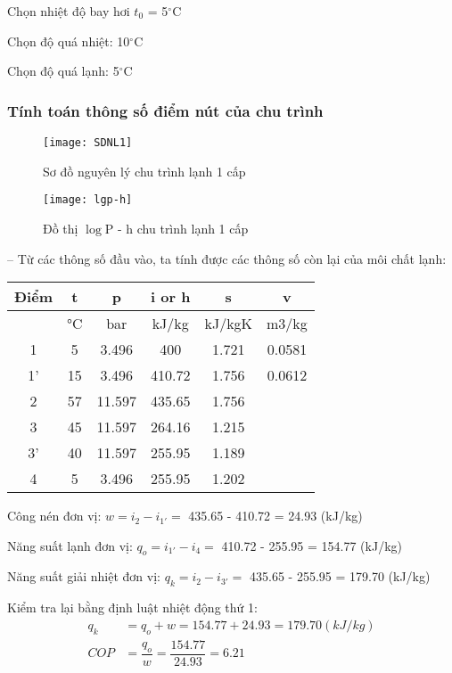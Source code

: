 Chọn nhiệt độ bay hơi $t_{0}$ = 5$^{\circ}$C

Chọn độ quá nhiệt: 10$^{\circ}$C

Chọn độ quá lạnh: 5$^{\circ}$C

\subsubsection{Tính toán thông số điểm nút của chu trình}
\begin{figure}[H]
	\centering
	\texttt{[image: SDNL1]}
	\caption{Sơ đồ nguyên lý chu trình lạnh 1 cấp}
	\texttt{[image: lgp-h]}
	\caption{Đồ thị $\log$P - h chu trình lạnh 1 cấp}
\end{figure}

-- Từ các thông số đầu vào, ta tính được các thông số còn lại của môi chất lạnh:

\begin{table}[H]
	\vspace{0.5cm}
	\centering
	
	\begin{tabular}{|c|c|c|c|c|c|}
		\hline
		Điểm  & t     & p     & i or h & s     & v \bigstrut\\
		\hline
		& °C    & bar   & kJ/kg & kJ/kgK & m3/kg \bigstrut\\
		\hline
		1     & 5     & 3.496 & 400   & 1.721 & 0.0581 \bigstrut\\
		\hline
		1'    & 15    & 3.496 & 410.72 & 1.756 & 0.0612 \bigstrut\\
		\hline
		2     & 57    & 11.597 & 435.65 & 1.756 &  \bigstrut\\
		\hline
		3     & 45    & 11.597 & 264.16 & 1.215 &  \bigstrut\\
		\hline
		3'    & 40    & 11.597 & 255.95 & 1.189 &  \bigstrut\\
		\hline
		4     & 5     & 3.496 & 255.95 & 1.202 &  \bigstrut\\
		\hline
	\end{tabular}%
\end{table}

Công nén đơn vị: $w = i_{2} - i_{1'} = $ 435.65 - 410.72 = 24.93 (kJ/kg)

Năng suất lạnh đơn vị: $q_{o} = i_{1'} - i_{4} = $ 410.72 - 255.95 = 154.77 (kJ/kg)

Năng suất giải nhiệt đơn vị: $q_{k} = i_{2} - i_{3'} = $ 435.65 - 255.95 = 179.70 (kJ/kg)

Kiểm tra lại bằng định luật nhiệt động thứ 1:
\begin{equation*}
	\begin{split}
		q_{k} &= q_{o} + w = 154.77 + 24.93 = 179.70 (kJ/kg)\\	
		COP &= \dfrac{q_{o}}{w} = \dfrac{154.77}{24.93} = 6.21
	\end{split}
\end{equation*}

